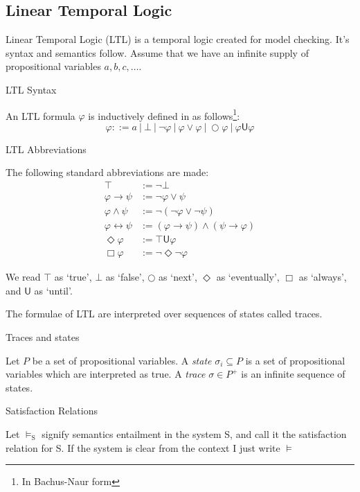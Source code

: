 \documentclass[a4paper]{article}
\newcommand{\U}{\mathsf{U}}
\begin{document}
\subsection{Linear Temporal Logic}
Linear Temporal Logic (LTL)\autocite{pnueli1977temporal} is a temporal logic created for model checking. It's syntax and semantics follow. Assume that we have an infinite supply of propositional variables $a,b,c,\dots$.
\begin{defn}{LTL Syntax}

  An LTL formula $\varphi$ is inductively defined in as follows\footnote{In Bachus-Naur form}:
  \[\varphi ::= a ~|~ \bot ~|~ \neg \varphi ~|~\varphi \lor \varphi ~|~ \bigcirc \varphi ~|~ \varphi \U\varphi\]
\end{defn}
\begin{notn}{LTL Abbreviations}\label{ltlabbrev}

  The following standard abbreviations are made:
  \begin{align*}
    \top &:= \neg \bot\\
    \varphi \to \psi &:= \neg \varphi \lor \psi\\
    \varphi \land \psi &:= \neg (\neg \varphi \lor \neg \psi)\\
    \varphi \leftrightarrow \psi &:= (\varphi \to \psi) \land (\psi \to \varphi)\\
    \Diamond \varphi &:= \top \U{} \varphi\\
    \Box \varphi &:= \neg\Diamond\neg\varphi
  \end{align*}
\end{notn}

We read $\top$ as `true', $\bot$ as `false', $\bigcirc$ as `next', $\Diamond$ as `eventually', $\Box$ as `always', and $\U$ as `until'.

The formulae of LTL are interpreted over sequences of states called traces.

\begin{defn}{Traces and states}

  Let $P$ be a set of propositional variables. A \emph{state} $\sigma_i \subseteq P$ is a set of propositional variables which are interpreted as true. A \emph{trace} $\sigma \in P^+$ is an infinite sequence of states.
\end{defn}

\begin{notn}{Satisfaction Relations}

  Let $\vDash_{\text{S}}$ signify semantics entailment in the system S, and call it the satisfaction relation for S. If the system is clear from the context I just write $\vDash$

\end{notn}
\end{document}
